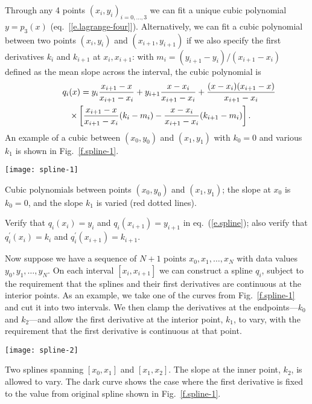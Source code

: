 Through any 4 points $(x_{i},y_{i})_{i=0,\ldots,3}$ we can fit a unique cubic polynomial $y=p_{3}(x)$ (eq.~[\ref{e.lagrange-four}]).  Alternatively, we can fit a cubic polynomial between two points $(x_{i},y_{i})$ and $(x_{i+1},y_{i+1})$ if we also specify the first derivatives $k_{i}$ and $k_{i+1}$ at $x_{i},x_{i+1}$: with $m_{i} = (y_{i+1}-y_{i})/(x_{i+1}-x_{i})$ defined as the mean slope across the interval, the cubic polynomial is
\begin{eqnarray}
\lefteqn{q_{i}(x) =   y_{i}\frac{x_{i+1}-x}{x_{i+1}-x_{i}} 
		   + y_{i+1}\frac{x-x_{i}}{x_{i+1}-x_{i}}
		   + \frac{(x-x_{i})(x_{i+1}-x)}{x_{i+1}-x_{i}}} && \nonumber\\
		   && \times\left[\frac{x_{i+1}-x}{x_{i+1}-x_{i}}(k_{i}-m_{i})
		       -\frac{x-x_{i}}{x_{i+1}-x_{i}}(k_{i+1}-m_{i})\right].
\label{e.spline}
\end{eqnarray}
An example of a cubic between $(x_{0},y_{0})$ and $(x_{1},y_{1})$ with $k_{0}=0$ and various $k_{1}$ is shown in Fig.~\ref{f.spline-1}.
\begin{marginfigure}[-8\baselineskip]
\texttt{[image: spline-1]}
\caption[Cubic polynomial with varying right-hand slopes]{\label{f.spline-1}Cubic polynomials between points $(x_{0},y_{0})$ and $(x_{1},y_{1})$; the slope at $x_{0}$ is $k_{0}=0$, and the slope $k_{1}$ is varied (red dotted lines).}
\end{marginfigure}

\begin{exercisebox}
Verify that $q_{i}(x_{i}) = y_{i}$ and $q_{i}(x_{i+1}) = y_{i+1}$ in eq.~(\ref{e.spline}); also verify that $q^{\prime}_{i}(x_{i}) = k_{i}$ and $q^{\prime}_{i}(x_{i+1}) = k_{i+1}$.
\end{exercisebox}

Now suppose we have a sequence of $N+1$ points $x_{0},x_{1},\ldots,x_{N}$ with data values $y_{0},y_{1},\ldots,y_{N}$. On each interval $[x_{i},x_{i+1}]$ we can construct a spline $q_{i}$, subject to the requirement that the splines and their first derivatives are continuous at the interior points. As an example, we take one of the curves from Fig.~\ref{f.spline-1} and cut it into two intervals. We then clamp the derivatives at the endpoints---$k_{0}$ and $k_{2}$---and allow the first derivative at the interior point, $k_{1}$, to vary, with the requirement that the first derivative is continuous at that point.
\begin{marginfigure}
\texttt{[image: spline-2]}
\caption[Two splines connected at an interior point]{\label{f.spline-2} Two splines spanning $[x_{0},x_{1}]$ and $[x_{1},x_{2}]$. The slope at the inner point, $k_{2}$, is allowed to vary. The dark curve shows the case where the first derivative is fixed to the value from original spline shown in Fig.~\ref{f.spline-1}.}
\end{marginfigure}

